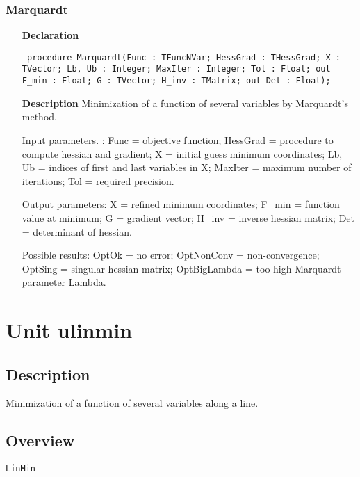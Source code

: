 \documentclass[12pt,a4paper,oneside]{report}
\newcommand{\declarationitem}[1]{\textbf{#1}}
\newcommand{\descriptiontitle}[1]{\textbf{#1}}
\newcommand{\code}[1]{\texttt{#1}}
\begin{document}
\subsubsection{Marquardt}
\label{umarq-Marquardt}
\begin{itemize}\item[\declarationitem{Declaration}\hfill]
	\begin{flushleft}
		\code{
			procedure Marquardt(Func : TFuncNVar; HessGrad : THessGrad; X : TVector; Lb, Ub : Integer; MaxIter : Integer; Tol : Float; out F{\_}min : Float; G : TVector; H{\_}inv : TMatrix; out Det : Float);}
		
	\end{flushleft}
	
	\par
	\item[\descriptiontitle{Description}]
	Minimization of a function of several variables by Marquardt's method.
	
	Input parameters. : Func = objective function; HessGrad = procedure to compute hessian and gradient; X = initial guess minimum coordinates; Lb, Ub = indices of first and last variables in X; MaxIter = maximum number of iterations; Tol = required precision.
	
	Output parameters: X = refined minimum coordinates; F{\_}min = function value at minimum; G = gradient vector; H{\_}inv = inverse hessian matrix; Det = determinant of hessian.
	
	Possible results: OptOk = no error; OptNonConv = non{-}convergence; OptSing = singular hessian matrix; OptBigLambda = too high Marquardt parameter Lambda.
	
\end{itemize}
\section{Unit ulinmin}
\label{ulinmin}
\subsection{Description}
Minimization of a function of several variables along a line.
\subsection{Overview}
\begin{description}
	\item[\texttt{LinMin}]
\end{description}
\end{document}
